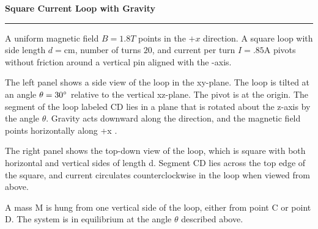 \pagebreak
\begin{example}
\textbf{Square Current Loop with Gravity}
\vspace{.25cm}
\hrule
\vspace{.25cm}
    A uniform magnetic field \(B = 1.8 T\) points in the \(+x\) direction. A square loop with side length \(d = \text{cm}\), number of turns \(20\), and current per turn \(I =.85 \text{A}\) pivots without friction around a vertical pin aligned with the -axis.

    The left panel shows a side view of the loop in the xy-plane. The loop is tilted at an angle \(\theta = 30 \degree\) relative to the vertical xz-plane. The pivot is at the origin. The segment of the loop labeled CD lies in a plane that is rotated about the z-axis by the angle \(\theta\). Gravity acts downward along the direction, and the magnetic field points horizontally along +x .

    The right panel shows the top-down view of the loop, which is square with both horizontal and vertical sides of length d. Segment CD lies across the top edge of the square, and current circulates counterclockwise in the loop when viewed from above.

    A mass M is hung from one vertical side of the loop, either from point C or point D. The system is in equilibrium at the angle \(\theta\) described above.
\begin{center}


\end{center}
\end{example}
